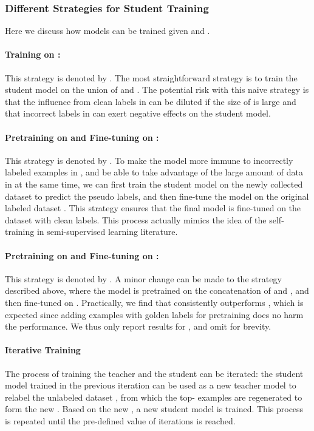 \documentclass[11pt,a4paper]{article}
\begin{document}
\subsubsection{Different Strategies for Student Training }
Here we discuss how models can be trained given  and . 
\paragraph{Training on :}
This strategy is denoted by .
The most straightforward strategy is to train the student model on the union of  and . 
The potential risk with this naive strategy is that 
the influence from clean labels in  can be diluted if the size of  is large and that 
 incorrect labels in  can exert  negative effects on 
the student model.

\paragraph{Pretraining on  and Fine-tuning on :}
This strategy is denoted by .
To make the model more immune to incorrectly labeled examples in , and be able to take advantage of the large amount of data in  at the same time, we can first 
train the student model
 on the newly collected dataset  to predict the pseudo labels, and then fine-tune the model on the original labeled dataset . 
This strategy 
 ensures that
the final model is fine-tuned on the dataset with clean labels.
This process actually mimics the idea of the self-training \citep{devlin2018bert,xie2020self,chen2020big,grill2020bootstrap} in semi-supervised learning literature. 

\paragraph{Pretraining on  and Fine-tuning on :}
This strategy is denoted by . 
A minor change can be made to the strategy described above, where the model is pretrained on the concatenation of  and , and then fine-tuned on . 
Practically, 
we find that   consistently outperforms 
, which is expected since adding examples with golden labels for pretraining does no harm the performance. 
We thus only report results for , and omit  for brevity. 

\paragraph{Iterative Training}
The process of training the teacher and the student 
 can be iterated: 
the student model trained in the previous iteration 
 can be used 
as  a new teacher model  
to   relabel the unlabeled dataset , 
       from which the top- examples are regenerated to form the new . 
       Based on the new , a new student model is trained. 
       This process is repeated until the pre-defined value of iterations  is reached. 
\end{document}
